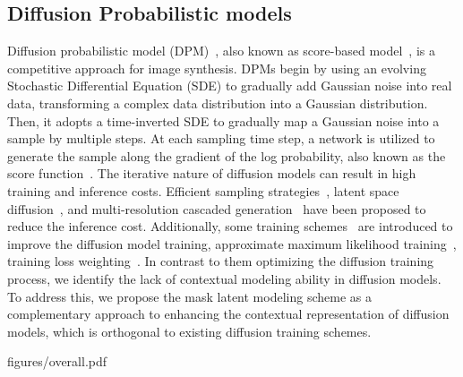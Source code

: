 \documentclass[final]{cvpr}
\begin{document}
\subsection{Diffusion Probabilistic models}
Diffusion probabilistic model (DPM)~\cite{ho2020denoising,dhariwal2021diffusion}, 
also known as score-based model~\cite{song2019generative,song2020improved},
is a competitive approach for image synthesis.
DPMs begin by using an evolving Stochastic Differential Equation (SDE) to gradually add   
Gaussian noise into real data, transforming a complex data distribution into a  
Gaussian distribution.  
Then, it adopts a time-inverted SDE to gradually map a Gaussian noise into a sample by multiple steps.
At each sampling time step, a network is utilized to generate the sample along the gradient of the log probability, also known as the score function~\cite{song2020score}.
The iterative nature of diffusion models can result in high training and inference costs. 
Efficient sampling strategies~\cite{ho2020denoising,lu2022dpm,salimans2022progressive,ho2022classifier,song2020denoising}, 
latent space diffusion~\cite{rombach2022high,vahdat2021score},
and multi-resolution cascaded generation~\cite{ho2022cascaded}
have been proposed to reduce the inference cost.
Additionally,
some training schemes~\cite{dockhorn2021score,bao2022estimating} are introduced to improve the diffusion model training,
\eg approximate maximum likelihood training~\cite{song2021maximum,nichol2021improved,kingma2021variational},
training loss weighting~\cite{kim2021soft,Karras2022edm}.
In contrast to them optimizing the diffusion training process,
we identify the lack of contextual modeling ability in diffusion models.
To address this,
we propose the mask latent modeling scheme
as a complementary approach to enhancing the contextual representation of diffusion models,
which is orthogonal to existing diffusion training schemes. 


\begin{figure*}[!t]
	\centering
	\begin{overpic}[width=1\linewidth]{figures/overall.pdf}
	\end{overpic}
	\caption{The overall framework of Masked Diffusion Transformer (MDT).
		Solid/dotted line indicates the training/inference process for each time step.
		Masking and side-interpolater are 
	 only used during training and are  removed during inference. 
	}\label{fig:overall}
\end{figure*}
\end{document}
